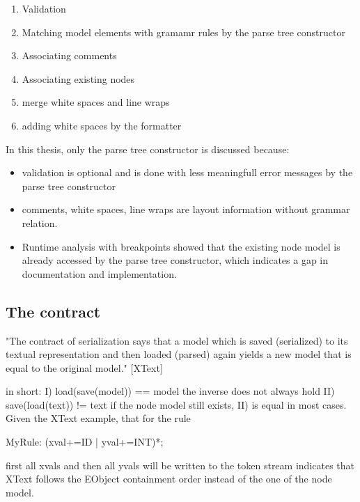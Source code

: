 \begin{enumerate}
	\item Validation
	\item Matching model elements with gramamr rules by the parse tree constructor
	\item Associating comments
	\item Associating existing nodes
	\item merge white spaces and line wraps
	\item adding white spaces by the formatter
\end{enumerate}

In this thesis, only the parse tree constructor is discussed because:
\begin{itemize}
	\item validation is optional and is done with less meaningfull error messages by the parse tree constructor
	\item comments, white spaces, line wraps are layout information without grammar relation.
	\item Runtime analysis with breakpoints showed that the existing node model is already accessed by the parse tree constructor, which indicates a gap in documentation and implementation.
\end{itemize}

\subsection{The contract}
"The contract of serialization says that a model which is saved (serialized) to its textual representation and then loaded (parsed) again yields a new model that is equal to the original model." [XText]

in short:
I) load(save(model)) == model
the inverse does not always hold
II) save(load(text)) != text
if the node model still exists, II) is equal in most cases. 
Given the XText example, that for the rule
\begin{xtxt}
MyRule: (xval+=ID | yval+=INT)*; 
\end{xtxt}
first all xvals and then all yvals will be written to the token stream indicates that XText follows the  EObject containment order instead of the one of the node model.


